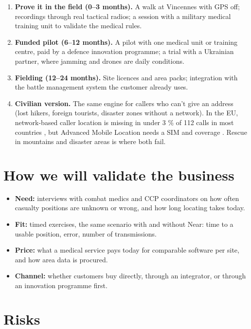 \begin{enumerate}
  \item \textbf{Prove it in the field (0--3 months).} A walk at Vincennes with GPS off; recordings through real tactical
        radios; a session with a military medical training unit to validate the medical rules.
  \item \textbf{Funded pilot (6--12 months).} A pilot with one medical unit or training centre, paid by a defence innovation
        programme; a trial with a Ukrainian partner, where jamming and drones are daily conditions.
  \item \textbf{Fielding (12--24 months).} Site licences and area packs; integration with the battle management system the
        customer already uses.
  \item \textbf{Civilian version.} The same engine for callers who can't give an address (lost hikers, foreign tourists,
        disaster zones without a network). In the EU, network-based caller location is missing in under 3 \% of 112 calls in
        most countries \cite{eu112}, but Advanced Mobile Location needs a SIM and coverage \cite{eu112}. Rescue in
        mountains and disaster areas is where both fail.
\end{enumerate}

\section{How we will validate the business}\label{sec:validate}

\begin{itemize}
  \item \textbf{Need:} interviews with combat medics and CCP coordinators on how often casualty positions are unknown or
        wrong, and how long locating takes today.
  \item \textbf{Fit:} timed exercises, the same scenario with and without Near: time to a usable position, error, number of
        transmissions.
  \item \textbf{Price:} what a medical service pays today for comparable software per site, and how area data is procured.
  \item \textbf{Channel:} whether customers buy directly, through an integrator, or through an innovation programme first.
\end{itemize}

\section{Risks}

